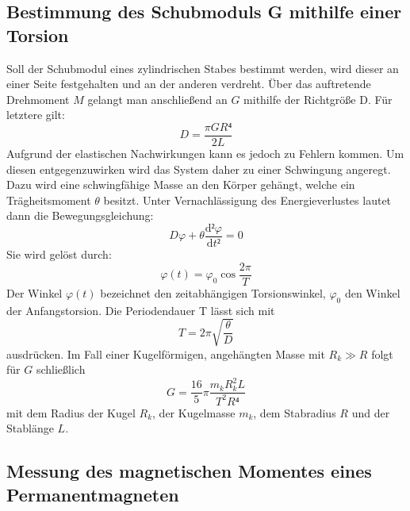  \subsection{Bestimmung des Schubmoduls G mithilfe einer Torsion}
 Soll der Schubmodul eines zylindrischen Stabes bestimmt werden, wird dieser
  an einer Seite festgehalten und an der anderen verdreht. Über das auftretende
   Drehmoment $M$ gelangt man anschließend an $G$ mithilfe der Richtgröße D. Für letztere gilt:
   \begin{equation}
     D = \frac{\pi GR⁴}{2L}
   \end{equation}
Aufgrund der elastischen Nachwirkungen kann es jedoch zu Fehlern kommen.
Um diesen entgegenzuwirken wird das System daher zu einer Schwingung angeregt.
 Dazu wird eine schwingfähige Masse an den Körper gehängt, welche ein Trägheitsmoment $\theta$ besitzt.
Unter Vernachlässigung des Energieverlustes lautet dann die Bewegungsgleichung:
\begin{equation}
  D\varphi + \theta\frac{\text{d}²\varphi}{\text{d}t²} = 0
\end{equation}
Sie wird gelöst durch:
\begin{equation}
\varphi(t) = \varphi_0 \cos\frac{2\pi}{T}
\end{equation}
Der Winkel $\varphi(t)$ bezeichnet den zeitabhängigen Torsionswinkel,
 $\varphi_0$ den Winkel der Anfangstorsion. Die Periodendauer T lässt sich mit
\begin{equation}
  T = 2\pi\sqrt{\frac{\theta}{D}}
\end{equation}
ausdrücken. Im Fall einer Kugelförmigen, angehängten Masse mit $R_k \gg R$ folgt für $G$ schließlich
\begin{equation}
G = \frac{16}{5} \pi \frac{m_kR^2_kL}{T^2R⁴}
\end{equation}
mit dem Radius der Kugel $R_k$, der Kugelmasse $m_k$, dem Stabradius $R$ und der Stablänge $L$.

\subsection{Messung des magnetischen Momentes eines Permanentmagneten}
